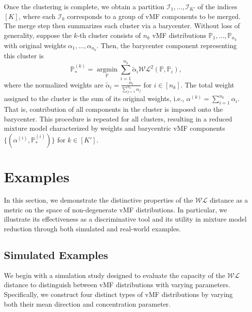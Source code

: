 \documentclass[10pt]{article}
\DeclareMathOperator*{\argmin}{argmin}
\newcommand{\bbP}{\mathbb{P}}
\newcommand{\calI}{\mathcal{I}}
\newcommand{\WL}{\mathcal{WL}}
\begin{document}
Once the clustering is complete, we obtain a partition ${\calI_1, \ldots, \calI_{K'}}$ of the indices $[K]$, where each $\calI_k$ corresponds to a group of vMF components to be merged. The \textsf{merge} step then summarizes each cluster via a barycenter. Without loss of generality, suppose the $k$-th cluster consists of $n_k$ vMF distributions ${\bbP_1, \ldots, \bbP_{n_k}}$ with original weights ${\alpha_1, \ldots, \alpha_{n_k}}$. Then, the barycenter component representing this cluster is
\begin{equation*}
	\bbP_*^{(k)} = \underset{\bbP}{\argmin} \sum_{i=1}^{n_k} \tilde{\alpha}_i \WL^2 (\bbP, \bbP_i),
\end{equation*}
where the normalized weights are $\tilde{\alpha}_i = \frac{\alpha_i}{\sum_{j=1}^{n_k} \alpha_j}$ for $i \in [n_k]$. The total weight assigned to the cluster is the sum of its original weights, i.e., $\alpha^{(k)} = \sum_{i=1}^{n_k} \alpha_i$. That is, contribution of all components in the cluster is imposed onto the barycenter. This procedure is repeated for all clusters, resulting in a reduced mixture model characterized by weights and barycentric vMF components $\lbrace (\alpha^{(i)}, \bbP_*^{(i)})\rbrace$ for $k \in [K']$.



\section{Examples}

In this section, we demonstrate the distinctive properties of the $\WL$ distance as a metric on the space of non-degenerate vMF distributions. In particular, we illustrate its effectiveness as a discriminative tool and its utility in mixture model reduction through both simulated and real-world examples.

\subsection{Simulated Examples}

We begin with a simulation study designed to evaluate the capacity of the $\WL$ distance to distinguish between vMF distributions with varying parameters. Specifically, we construct four distinct types of vMF distributions by varying both their mean direction and concentration parameter.
\end{document}
